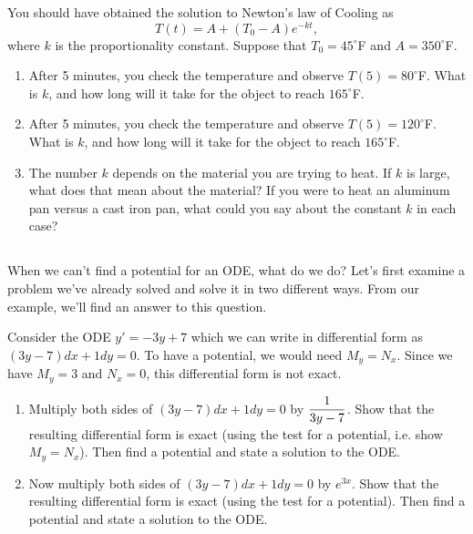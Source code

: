 \begin{problem}
 You should have obtained the solution to Newton's law of Cooling as $$T(t) = A+(T_0-A)e^{-kt},$$ where $k$ is the proportionality constant. Suppose that $T_0=45^\circ$F and $A=350^\circ$F.  
\begin{enumerate}
 \item After 5 minutes, you check the temperature and observe $T(5)=80^\circ$F.  What is $k$, and how long will it take for the object to reach $165^\circ$F. 
 \item After 5 minutes, you check the temperature and observe $T(5)=120^\circ$F.  What is $k$, and how long will it take for the object to reach $165^\circ$F. 
 \item The number $k$ depends on the material you are trying to heat.  If $k$ is large, what does that mean about the material? If you were to heat an aluminum pan versus a cast iron pan, what could you say about the constant $k$ in each case?
\end{enumerate}
\end{problem}





\subsection*{\ideaB}
When we can't find a potential for an ODE, what do we do?  Let's first examine a problem we've already solved and solve it in two different ways. From our example, we'll find an answer to this question.


\begin{problem}\label{integrating factor introduction}
 Consider the ODE $y'=-3y+7$ which we can write in differential form as $(3y-7)dx+1dy=0.$  To have a potential, we would need $M_y=N_x$.
 Since we have $M_y=3$ and $N_x=0$, this differential form is not exact.  
\begin{enumerate}
 \item Multiply both sides of  $(3y-7)dx+1dy=0$ by $\displaystyle\frac{1}{3y-7}$. Show that the resulting differential form is exact (using the test for a potential, i.e. show $M_y=N_x$). Then find a potential and state a solution to the ODE.
 \item 
Now multiply both sides of $(3y-7)dx+1dy=0$ by $e^{3x}$. Show that the resulting differential form is exact (using the test for a potential). Then find a potential and state a solution to the ODE.
\end{enumerate}
\end{problem}

